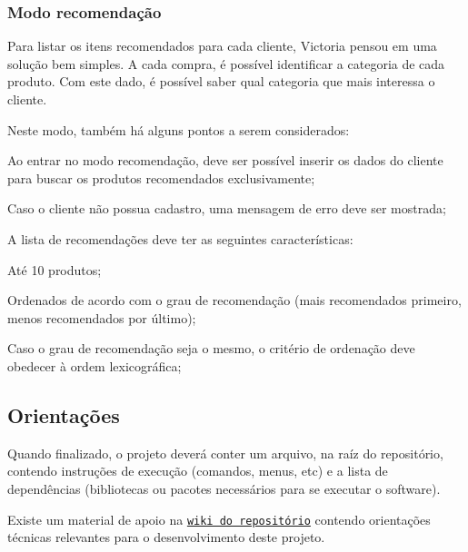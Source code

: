 \subsubsection*{Modo recomendação}

Para listar os itens recomendados para cada cliente, Victoria pensou em uma solução bem simples. A cada compra, é possível identificar a categoria de cada produto. Com este dado, é possível saber qual categoria que mais interessa o cliente.

Neste modo, também há alguns pontos a serem considerados\+:
\begin{DoxyItemize}
\item Ao entrar no modo recomendação, deve ser possível inserir os dados do cliente para buscar os produtos recomendados exclusivamente;
\item Caso o cliente não possua cadastro, uma mensagem de erro deve ser mostrada;
\item A lista de recomendações deve ter as seguintes características\+:
\begin{DoxyItemize}
\item Até 10 produtos;
\item Ordenados de acordo com o grau de recomendação (mais recomendados primeiro, menos recomendados por último);
\item Caso o grau de recomendação seja o mesmo, o critério de ordenação deve obedecer à ordem lexicográfica;
\end{DoxyItemize}
\end{DoxyItemize}

\subsection*{Orientações}

Quando finalizado, o projeto deverá conter um arquivo, na raíz do repositório, contendo instruções de execução (comandos, menus, etc) e a lista de dependências (bibliotecas ou pacotes necessários para se executar o software).

Existe um material de apoio na \href{https://gitlab.com/oofga/eps/eps_2019_2/ep1/wikis/Home}{\tt wiki do repositório} contendo orientações técnicas relevantes para o desenvolvimento deste projeto. 